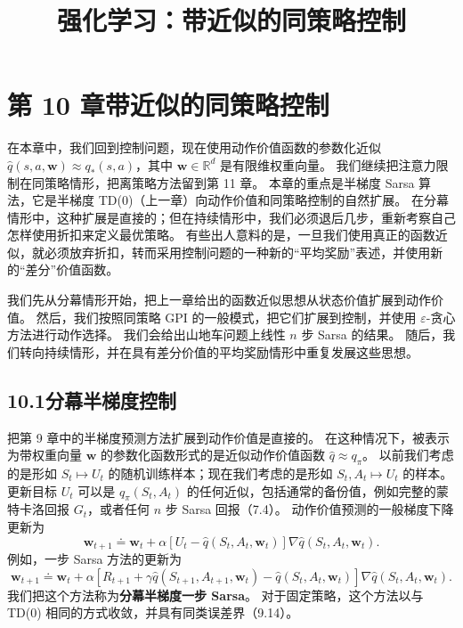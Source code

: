 \documentclass[UTF8,12pt,a4paper,fontset=fandol]{ctexart}
\title{强化学习：带近似的同策略控制}
\author{}
\date{}
\begin{document}
\maketitle

\section*{第 10 章\quad 带近似的同策略控制}

在本章中，我们回到控制问题，现在使用动作价值函数的参数化近似
$\hat q(s,a,\mathbf{w})\approx q_*(s,a)$，其中 $\mathbf{w}\in\mathbb{R}^d$ 是有限维权重向量。
我们继续把注意力限制在同策略情形，把离策略方法留到第 11 章。
本章的重点是半梯度 Sarsa 算法，它是半梯度 TD(0)（上一章）向动作价值和同策略控制的自然扩展。
在分幕情形中，这种扩展是直接的；但在持续情形中，我们必须退后几步，重新考察自己怎样使用折扣来定义最优策略。
有些出人意料的是，一旦我们使用真正的函数近似，就必须放弃折扣，转而采用控制问题的一种新的“平均奖励”表述，并使用新的“差分”价值函数。

我们先从分幕情形开始，把上一章给出的函数近似思想从状态价值扩展到动作价值。
然后，我们按照同策略 GPI 的一般模式，把它们扩展到控制，并使用 $\varepsilon$-贪心方法进行动作选择。
我们会给出山地车问题上线性 $n$ 步 Sarsa 的结果。
随后，我们转向持续情形，并在具有差分价值的平均奖励情形中重复发展这些思想。

\subsection*{10.1\quad 分幕半梯度控制}

把第 9 章中的半梯度预测方法扩展到动作价值是直接的。
在这种情况下，被表示为带权重向量 $\mathbf{w}$ 的参数化函数形式的是近似动作价值函数 $\hat q\approx q_\pi$。
以前我们考虑的是形如 $S_t\mapsto U_t$ 的随机训练样本；现在我们考虑的是形如 $S_t,A_t\mapsto U_t$ 的样本。
更新目标 $U_t$ 可以是 $q_\pi(S_t,A_t)$ 的任何近似，包括通常的备份值，例如完整的蒙特卡洛回报 $G_t$，或者任何 $n$ 步 Sarsa 回报（7.4）。
动作价值预测的一般梯度下降更新为
\begin{equation}
\mathbf{w}_{t+1}\doteq \mathbf{w}_t+\alpha\left[U_t-\hat q(S_t,A_t,\mathbf{w}_t)\right]\nabla\hat q(S_t,A_t,\mathbf{w}_t).
\tag{10.1}
\end{equation}
例如，一步 Sarsa 方法的更新为
\begin{equation}
\mathbf{w}_{t+1}\doteq \mathbf{w}_t+\alpha\left[R_{t+1}+\gamma\hat q(S_{t+1},A_{t+1},\mathbf{w}_t)-\hat q(S_t,A_t,\mathbf{w}_t)\right]\nabla\hat q(S_t,A_t,\mathbf{w}_t).
\tag{10.2}
\end{equation}
我们把这个方法称为\textbf{分幕半梯度一步 Sarsa}。
对于固定策略，这个方法以与 TD(0) 相同的方式收敛，并具有同类误差界（9.14）。
\end{document}

